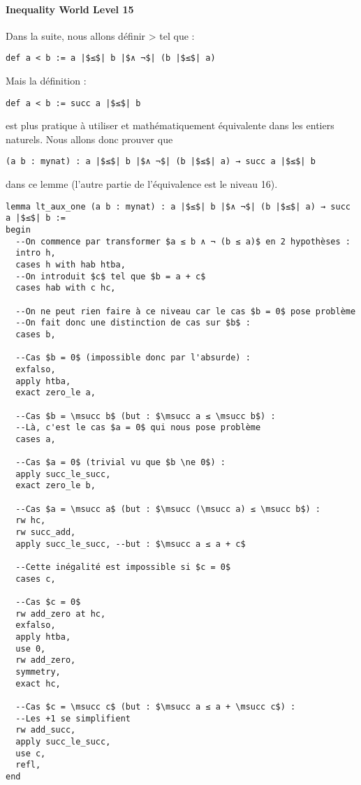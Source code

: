 \paragraph{Inequality World Level 15}

Dans la suite, nous allons définir > tel que :
\begin{verbatim}
def a < b := a |$≤$| b |$∧ ¬$| (b |$≤$| a)
\end{verbatim}
Mais la définition :
\begin{verbatim}
def a < b := succ a |$≤$| b
\end{verbatim}
est plus pratique à utiliser et mathématiquement équivalente dans les entiers naturels.
Nous allons donc prouver que 
\begin{verbatim}
(a b : mynat) : a |$≤$| b |$∧ ¬$| (b |$≤$| a) → succ a |$≤$| b
\end{verbatim}
dans ce lemme (l'autre partie de l'équivalence est le niveau 16).

\begin{verbatim}
lemma lt_aux_one (a b : mynat) : a |$≤$| b |$∧ ¬$| (b |$≤$| a) → succ a |$≤$| b :=
begin
  --On commence par transformer $a ≤ b ∧ ¬ (b ≤ a)$ en 2 hypothèses :
  intro h,
  cases h with hab htba,
  --On introduit $c$ tel que $b = a + c$
  cases hab with c hc,

  --On ne peut rien faire à ce niveau car le cas $b = 0$ pose problème
  --On fait donc une distinction de cas sur $b$ :
  cases b,

  --Cas $b = 0$ (impossible donc par l'absurde) :
  exfalso,
  apply htba,
  exact zero_le a,

  --Cas $b = \msucc b$ (but : $\msucc a ≤ \msucc b$) :
  --Là, c'est le cas $a = 0$ qui nous pose problème
  cases a,

  --Cas $a = 0$ (trivial vu que $b \ne 0$) :
  apply succ_le_succ,
  exact zero_le b,

  --Cas $a = \msucc a$ (but : $\msucc (\msucc a) ≤ \msucc b$) :
  rw hc,
  rw succ_add,
  apply succ_le_succ, --but : $\msucc a ≤ a + c$
  
  --Cette inégalité est impossible si $c = 0$
  cases c,

  --Cas $c = 0$
  rw add_zero at hc,
  exfalso,
  apply htba,
  use 0,
  rw add_zero,
  symmetry,
  exact hc,

  --Cas $c = \msucc c$ (but : $\msucc a ≤ a + \msucc c$) :
  --Les +1 se simplifient
  rw add_succ,
  apply succ_le_succ,
  use c,
  refl,
end
\end{verbatim}
